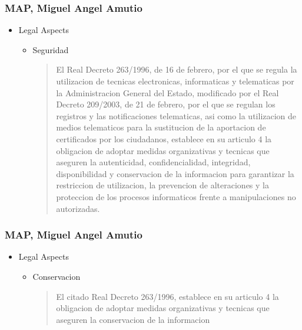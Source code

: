 \documentclass{beamer}
\begin{document}
\begin{frame}
\frametitle{ MAP, Miguel Angel Amutio}

\begin{itemize}
\item Legal Aspects
\begin {itemize}
	\item Seguridad
	\begin{quote} 
El Real Decreto 263/1996, de 16 de febrero, por el que se regula la utilizacion de tecnicas electronicas, informaticas y telematicas
por la Administracion General del Estado, modificado por el Real Decreto 209/2003, de 21 de febrero, por el que se regulan
los registros y las notificaciones telematicas, asi como la utilizacion de medios telematicos para la sustitucion de la aportacion de
certificados por los ciudadanos, establece en su articulo 4 la obligacion de adoptar medidas organizativas y tecnicas
que aseguren la autenticidad, confidencialidad, integridad, disponibilidad y conservacion de la informacion para
garantizar la restriccion de utilizacion, la prevencion de alteraciones y la proteccion de los procesos informaticos
frente a manipulaciones no autorizadas.

	\end{quote}
\end {itemize}
\end{itemize}

\end{frame}


\begin{frame}
\frametitle{ MAP, Miguel Angel Amutio}

\begin{itemize}
\item Legal Aspects
\begin {itemize}
	\item Conservacion
	\begin{quote} 
El citado Real Decreto 263/1996, establece en su articulo 4 la obligacion de adoptar medidas organizativas y
tecnicas que aseguren la conservacion de la informacion

	\end{quote}
\end {itemize}
\end{itemize}

\end{frame}
\end{document}

